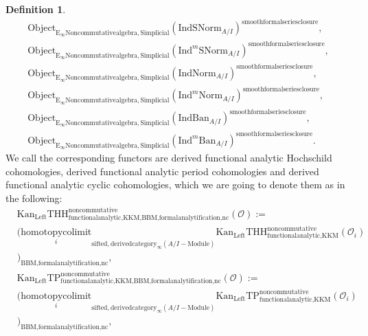 \documentclass[11pt]{book}
\theoremstyle{definition}
\newtheorem{definition}[theorem]{Definition}
\numberwithin{equation}{section}
\begin{document}
\begin{definition}
\begin{align}
\mathrm{Object}_{\mathrm{E}_\infty\mathrm{Noncommutativealgebra},\mathrm{Simplicial}}(\mathrm{IndSNorm}_{A/I})^{\mathrm{smoothformalseriesclosure}},\\
\mathrm{Object}_{\mathrm{E}_\infty\mathrm{Noncommutativealgebra},\mathrm{Simplicial}}(\mathrm{Ind}^m\mathrm{SNorm}_{A/I})^{\mathrm{smoothformalseriesclosure}},\\
\mathrm{Object}_{\mathrm{E}_\infty\mathrm{Noncommutativealgebra},\mathrm{Simplicial}}(\mathrm{IndNorm}_{A/I})^{\mathrm{smoothformalseriesclosure}},\\
\mathrm{Object}_{\mathrm{E}_\infty\mathrm{Noncommutativealgebra},\mathrm{Simplicial}}(\mathrm{Ind}^m\mathrm{Norm}_{A/I})^{\mathrm{smoothformalseriesclosure}},\\
\mathrm{Object}_{\mathrm{E}_\infty\mathrm{Noncommutativealgebra},\mathrm{Simplicial}}(\mathrm{IndBan}_{A/I})^{\mathrm{smoothformalseriesclosure}},\\
\mathrm{Object}_{\mathrm{E}_\infty\mathrm{Noncommutativealgebra},\mathrm{Simplicial}}(\mathrm{Ind}^m\mathrm{Ban}_{A/I})^{\mathrm{smoothformalseriesclosure}}.
\end{align}
We call the corresponding functors are derived functional analytic Hochschild cohomologies, derived functional analytic period cohomologies and derived functional analytic cyclic cohomologies, which we are going to denote them as in the following:
\begin{align}
	&\mathrm{Kan}_{\mathrm{Left}}\mathrm{THH}^\mathrm{noncommutative}_{\text{functionalanalytic,KKM},\text{BBM,formalanalytification,nc}}(\mathcal{O}):=\\
	&(\underset{i}{\text{homotopycolimit}}_{\text{sifted},\text{derivedcategory}_{\infty}(A/I-\text{Module})}\mathrm{Kan}_{\mathrm{Left}}\mathrm{THH}^\mathrm{noncommutative}_{\text{functionalanalytic,KKM}}(\mathcal{O}_i)\\
	&)_\text{BBM,formalanalytification,nc},\\
	&\mathrm{Kan}_{\mathrm{Left}}\mathrm{TP}^\mathrm{noncommutative}_{\text{functionalanalytic,KKM},\text{BBM,formalanalytification,nc}}(\mathcal{O}):=\\
	&(\underset{i}{\text{homotopycolimit}}_{\text{sifted},\text{derivedcategory}_{\infty}(A/I-\text{Module})}\mathrm{Kan}_{\mathrm{Left}}\mathrm{TP}^\mathrm{noncommutative}_{\text{functionalanalytic,KKM}}(\mathcal{O}_i)\\
	&)_\text{BBM,formalanalytification,nc},\\

\end{align}
\end{definition}
\end{document}
